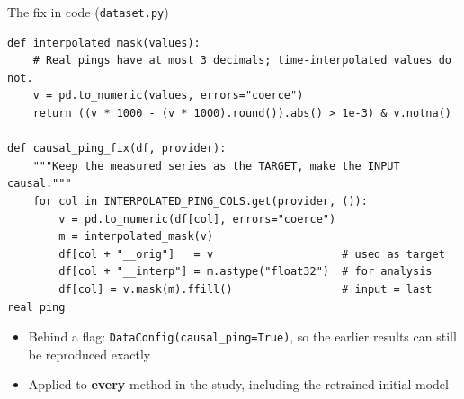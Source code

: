 \documentclass[aspectratio=169,11pt]{beamer}
\begin{document}
\begin{frame}[fragile]{The fix in code (\texttt{dataset.py})}
\begin{lstlisting}
def interpolated_mask(values):
    # Real pings have at most 3 decimals; time-interpolated values do not.
    v = pd.to_numeric(values, errors="coerce")
    return ((v * 1000 - (v * 1000).round()).abs() > 1e-3) & v.notna()

def causal_ping_fix(df, provider):
    """Keep the measured series as the TARGET, make the INPUT causal."""
    for col in INTERPOLATED_PING_COLS.get(provider, ()):
        v = pd.to_numeric(df[col], errors="coerce")
        m = interpolated_mask(v)
        df[col + "__orig"]   = v                    # used as target
        df[col + "__interp"] = m.astype("float32")  # for analysis
        df[col] = v.mask(m).ffill()                 # input = last real ping
\end{lstlisting}
  \vspace{0.2cm}
  \begin{itemize}\small
    \item Behind a flag: \texttt{DataConfig(causal\_ping=True)}, so the earlier results can still be reproduced exactly
    \item Applied to \textbf{every} method in the study, including the retrained initial model
  \end{itemize}
\end{frame}
\end{document}
